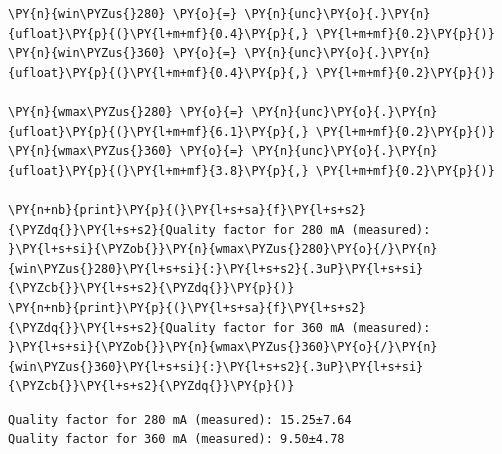     \begin{tcolorbox}[breakable, size=fbox, boxrule=1pt, pad at break*=1mm,colback=cellbackground, colframe=cellborder]
\begin{Verbatim}[commandchars=\\\{\}]
\PY{n}{win\PYZus{}280} \PY{o}{=} \PY{n}{unc}\PY{o}{.}\PY{n}{ufloat}\PY{p}{(}\PY{l+m+mf}{0.4}\PY{p}{,} \PY{l+m+mf}{0.2}\PY{p}{)}
\PY{n}{win\PYZus{}360} \PY{o}{=} \PY{n}{unc}\PY{o}{.}\PY{n}{ufloat}\PY{p}{(}\PY{l+m+mf}{0.4}\PY{p}{,} \PY{l+m+mf}{0.2}\PY{p}{)}

\PY{n}{wmax\PYZus{}280} \PY{o}{=} \PY{n}{unc}\PY{o}{.}\PY{n}{ufloat}\PY{p}{(}\PY{l+m+mf}{6.1}\PY{p}{,} \PY{l+m+mf}{0.2}\PY{p}{)}
\PY{n}{wmax\PYZus{}360} \PY{o}{=} \PY{n}{unc}\PY{o}{.}\PY{n}{ufloat}\PY{p}{(}\PY{l+m+mf}{3.8}\PY{p}{,} \PY{l+m+mf}{0.2}\PY{p}{)}

\PY{n+nb}{print}\PY{p}{(}\PY{l+s+sa}{f}\PY{l+s+s2}{\PYZdq{}}\PY{l+s+s2}{Quality factor for 280 mA (measured): }\PY{l+s+si}{\PYZob{}}\PY{n}{wmax\PYZus{}280}\PY{o}{/}\PY{n}{win\PYZus{}280}\PY{l+s+si}{:}\PY{l+s+s2}{.3uP}\PY{l+s+si}{\PYZcb{}}\PY{l+s+s2}{\PYZdq{}}\PY{p}{)}
\PY{n+nb}{print}\PY{p}{(}\PY{l+s+sa}{f}\PY{l+s+s2}{\PYZdq{}}\PY{l+s+s2}{Quality factor for 360 mA (measured): }\PY{l+s+si}{\PYZob{}}\PY{n}{wmax\PYZus{}360}\PY{o}{/}\PY{n}{win\PYZus{}360}\PY{l+s+si}{:}\PY{l+s+s2}{.3uP}\PY{l+s+si}{\PYZcb{}}\PY{l+s+s2}{\PYZdq{}}\PY{p}{)}
\end{Verbatim}
\end{tcolorbox}

    \begin{Verbatim}[commandchars=\\\{\}]
Quality factor for 280 mA (measured): 15.25±7.64
Quality factor for 360 mA (measured): 9.50±4.78
    \end{Verbatim}

